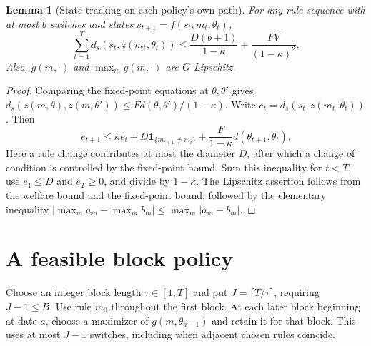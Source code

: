 \documentclass[11pt]{article}
\newtheorem{lemma}[theorem]{Lemma}
\theoremstyle{definition}
\theoremstyle{remark}
\begin{document}
\begin{lemma}[State tracking on each policy's own path]
For any rule sequence with at most $b$ switches and states $s_{t+1}=f(s_t,m_t,\theta_t)$,
\[
 \sum_{t=1}^T d_s(s_t,z(m_t,\theta_t))
 \le \frac{D(b+1)}{1-\kappa}+\frac{FV}{(1-\kappa)^2}.
\]
Also, $g(m,\cdot)$ and $\max_m g(m,\cdot)$ are $G$-Lipschitz.
\end{lemma}
\begin{proof}
Comparing the fixed-point equations at $\theta,\theta'$ gives $d_s(z(m,\theta),z(m,\theta'))\le Fd(\theta,\theta')/(1-\kappa)$. Write $e_t=d_s(s_t,z(m_t,\theta_t))$. Then
\[
 e_{t+1}\le\kappa e_t+D\mathbf1_{\{m_{t+1}\ne m_t\}}
 +\frac F{1-\kappa}d(\theta_{t+1},\theta_t).
\]
Here a rule change contributes at most the diameter $D$, after which a change of condition is controlled by the fixed-point bound. Sum this inequality for $t<T$, use $e_1\le D$ and $e_T\ge0$, and divide by $1-\kappa$. The Lipschitz assertion follows from the welfare bound and the fixed-point bound, followed by the elementary inequality $|\max_m a_m-\max_m b_m|\le\max_m|a_m-b_m|$.
\end{proof}

\section{A feasible block policy}
Choose an integer block length $\tau\in[1,T]$ and put $J=\lceil T/\tau\rceil$, requiring $J-1\le B$. Use rule $m_0$ throughout the first block. At each later block beginning at date $a$, choose a maximizer of $g(m,\theta_{a-1})$ and retain it for that block. This uses at most $J-1$ switches, including when adjacent chosen rules coincide.
\end{document}
